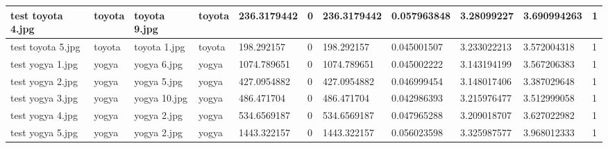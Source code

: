 \begin{landscape}
\begin{longtable}{|p{2cm}|p{1.5cm}|p{2cm}|p{1.5cm}|p{2cm}|p{1cm}|p{2cm}|p{2cm}|p{2cm}|p{2cm}|p{1cm}|}
		test toyota 4.jpg    & toyota           & toyota 9.jpg          & toyota                      & 236.3179442           & 0                       & 236.3179442                & 0.057963848           & 3.28099227            & 3.690994263              & 1                \\ \hline
		test toyota 5.jpg    & toyota           & toyota 1.jpg          & toyota                      & 198.292157            & 0                       & 198.292157                 & 0.045001507           & 3.233022213           & 3.572004318              & 1                \\ \hline
		test yogya 1.jpg     & yogya            & yogya 6.jpg           & yogya                       & 1074.789651           & 0                       & 1074.789651                & 0.045002222           & 3.143194199           & 3.567206383              & 1                \\ \hline
		test yogya 2.jpg     & yogya            & yogya 5.jpg           & yogya                       & 427.0954882           & 0                       & 427.0954882                & 0.046999454           & 3.148017406           & 3.387029648              & 1                \\ \hline
		test yogya 3.jpg     & yogya            & yogya 10.jpg          & yogya                       & 486.471704            & 0                       & 486.471704                 & 0.042986393           & 3.215976477           & 3.512999058              & 1                \\ \hline
		test yogya 4.jpg     & yogya            & yogya 2.jpg           & yogya                       & 534.6569187           & 0                       & 534.6569187                & 0.047965288           & 3.209018707           & 3.627022982              & 1                \\ \hline
		test yogya 5.jpg     & yogya            & yogya 2.jpg           & yogya                       & 1443.322157           & 0                       & 1443.322157                & 0.056023598           & 3.325987577           & 3.968012333              & 1                \\ \hline
	\end{longtable}
\end{landscape}

